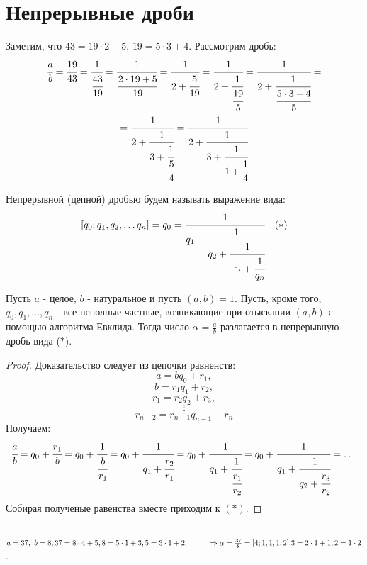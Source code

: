 \section{Непрерывные дроби}
    \begin{example}
        Заметим, что  $43=19\cdot 2+5$, $19=5\cdot 3+4$. Рассмотрим дробь:
        \begin{multline*}
            \cfrac{a}{b}=\cfrac{19}{43}=\cfrac{1}{\cfrac{43}{19}}=\cfrac{1}{\cfrac{2\cdot 19+5}{19}}=\cfrac{1}{2+\cfrac{5}{19}}=\cfrac{1}{2+\cfrac{1}{\cfrac{19}{5}}}=\cfrac{1}{2+\cfrac{1}{\cfrac{5\cdot 3+4}{5}}}=\\
            =\cfrac{1}{2+\cfrac{1}{3+\cfrac{1}{\cfrac{5}{4}}}}=\cfrac{1}{2+\cfrac{1}{3+\cfrac{1}{1+\cfrac{1}{4}}}}
        \end{multline*}
    \end{example}
    \begin{definition}
        Непрерывной (цепной) дробью будем называть выражение вида:
        \[[q_0; q_1, q_2, \dots q_n] = q_0=\cfrac{1}{q_1+\cfrac{1}{q_2+\cfrac{1}{\ddots+\cfrac{1}{q_n}}}}\ \ \ (\ast)\]
    \end{definition}
    \begin{theorem} \label{th7.1}
        Пусть $a$ - целое, $b$ - натуральное и пусть $(a,b)=1$. Пусть, кроме того, $q_0, q_1,\dots, q_n$ - все неполные частные, возникающие при отыскании $(a,b)$ с помощью алгоритма Евклида. Тогда число $\alpha=\frac{a}{b}$ разлагается в непрерывную дробь вида ($\ast$).
    \end{theorem} 
    \begin{proof}
        Доказательство следует из цепочки равненств:\\
        \[a=bq_0+r_1,\]
        \[b=r_1q_1+r_2,\]
        \[r_1=r_2q_2+r_3,\]
        \[\vdots\]
        \[r_{n-2}=r_{n-1}q_{n-1}+r_n\]
        Получаем:
        \begin{equation*}
            \cfrac{a}{b}=q_0+\cfrac{r_1}{b}=q_0+\cfrac{1}{\cfrac{b}{r_1}}=q_0+\cfrac{1}{q_1+\cfrac{r_2}{r_1}}=q_0+\cfrac{1}{q_1+\cfrac{1}{\cfrac{r_1}{r_2}}}=q_0+\cfrac{1}{q_1+\cfrac{1}{q_2+\cfrac{r_3}{r_2}}}=\dots
        \end{equation*}
        Собирая полученые равенства вместе приходим к $(\ast)$.
    \end{proof}
    \begin{example}\tab \\
        $a=37,\ b=8,\\
        37=8\cdot 4+5,\\
        8=5\cdot 1+3,\\
        5=3\cdot 1+2, \tab[1cm] \Rightarrow \alpha=\frac{37}{8}=[4;1,1,1,2].\\
        3=2\cdot 1+1,\\
        2=1\cdot 2$.
    \end{example}
